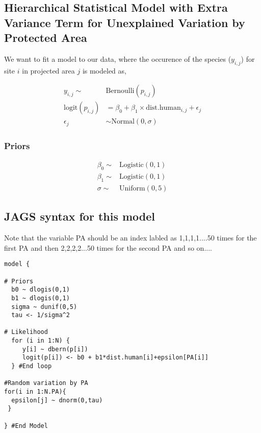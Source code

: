 \documentclass[12pt]{article}
\begin{document}
\subsection{Hierarchical Statistical Model with Extra Variance Term for Unexplained Variation by Protected Area}

\Large

We want to fit a model to our data, where the occurence of the species ($y_{i,j}$) for site $i$ in projected area $j$ is modeled as,

\begin{align*}
y_{i,j}\sim& \text{Bernoulli}(p_{i,j})\\
\text{logit}(p_{i,j}) &= \beta_{0} + \beta_{1}\times \text{dist.human}_{i,j}+ \epsilon_{j}\\
\epsilon_{j} &\sim \text{Normal}(0,\sigma)
\end{align*}

\subsubsection{Priors}

\begin{align*}
\beta_{0} \sim& \text{Logistic}(0, 1)\\
\beta_{1} \sim& \text{Logistic}(0, 1)\\
\sigma \sim& \text{Uniform}(0,5)
\end{align*}


\pagebreak

\subsection{JAGS syntax for this model}

Note that the variable PA should be an index labled as 1,1,1,1....50 times for the first PA and then 2,2,2,2...50 times for the second PA and so on....

\begin{verbatim}
model {

# Priors
  b0 ~ dlogis(0,1)
  b1 ~ dlogis(0,1)
  sigma ~ dunif(0,5)
  tau <- 1/sigma^2

# Likelihood
  for (i in 1:N) {
     y[i] ~ dbern(p[i])
     logit(p[i]) <- b0 + b1*dist.human[i]+epsilon[PA[i]]
  } #End loop

#Random variation by PA
for(i in 1:N.PA){
  epsilon[j] ~ dnorm(0,tau)
 }
 
} #End Model
\end{verbatim}
\end{document}
